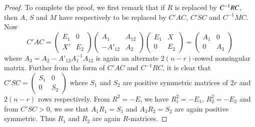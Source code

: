 \begin{proof}
To  complete the proof, we first remark that if $R$ is replaced by
$C^{-1}\break RC$, then $A$, $S$ and $M$ have respectively to be replaced by
$C' A C$, $C' S C$ and $C^{-1}MC$. Now
$$
C'AC = \left(\begin{smallmatrix} E_1 & 0 \\ X' &
 E_2 \end{smallmatrix} \right) \left(\begin{smallmatrix} A_1 & A_{12}
  \\ -A'_{12} & A_2 \end{smallmatrix} \right)
\left(\begin{smallmatrix} E_1 & X \\ 0 & E_2 \end{smallmatrix} \right)
=\left(\begin{smallmatrix} A_1 & 0 \\ 0 &
  A_3 \end{smallmatrix} \right) 
$$
where $A_3 = A_2 - A'_{12} A^{-1}_1 A_{12}$ is again an alternate
$2(n-r)$-rowed nonsingular matrix. Further from the form of $C' A C$
and $C^{-1}RC$, it is clear that $C'SC=\left(\begin{smallmatrix} S_1&
 0\\ 0 & S_2 \end{smallmatrix} \right)$ where $S_1$ and $S_2$ are
positive symmetric matrices of $2r$ and $2(n-r)$ rows
respectively. From $R^2=-E$, we \pageoriginale have $R^2_1 = -E_1$,
$R^2_2=-E_2$ and 
from $C' S C >0$, we see that $A_1 R_1 = S_1$ and $A_3 R_2 = S_2$ are
again positive symmetric. Thus $R_1$ and $R_2$ are again $R$-matrices.
\end{proof}

